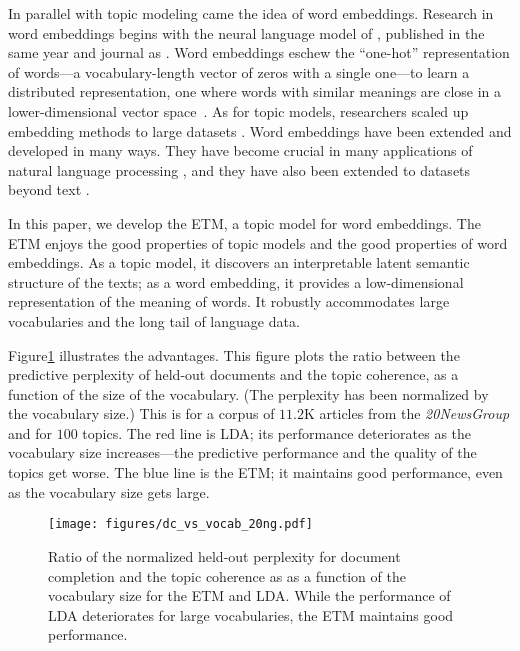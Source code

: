 \documentclass[11pt,a4paper]{article}
\begin{document}
In parallel with topic modeling came the idea of word embeddings.
Research in word embeddings begins with the neural language model of
\citet{Bengio:2003}, published in the same year and journal as
\citet{blei2003latent}. Word embeddings eschew the ``one-hot''
representation of words---a vocabulary-length vector of zeros with a
single one---to learn a distributed representation, one where words
with similar meanings are close in a lower-dimensional vector
space~\citep{Rumelhart:1973,bengio2006neural}.
As for topic models, researchers scaled
up embedding methods to large datasets
\citep{mikolov2013efficient,mikolov2013distributed,pennington2014glove,levy2014neural,mnih2013learning}.
Word embeddings have been extended and developed in many ways.  They
have become crucial in many applications of natural language
processing \citep{Li2017}, and they have also been extended to datasets
beyond text \citep{Rudolph2016}.

In this paper, we develop the \gls{ETM}, a topic model for word
embeddings. The \gls{ETM} enjoys the good properties of topic models
and the good properties of word embeddings.  As a topic model, it
discovers an interpretable latent semantic structure of the texts; as
a word embedding, it provides a low-dimensional representation of the
meaning of words.  It robustly accommodates large vocabularies and the
long tail of language data.

Figure\nobreakspace \ref {fig:log_lik_intro} illustrates the advantages.  This figure plots the
ratio between the predictive perplexity of held-out documents and the topic
coherence, as a function of the size of the vocabulary.
(The perplexity has been normalized by the vocabulary size.)
This is for a corpus of $11.2$K articles from the \textit{20NewsGroup} and for $100$ topics.  
The red line is \gls{LDA}; its performance deteriorates as the vocabulary size
increases---the predictive performance and the quality of the topics get worse. 
The blue line is the \gls{ETM};
it maintains good performance, even as the vocabulary size gets large.

\begin{figure}[t]
	\centering
	\texttt{[image: figures/dc\_vs\_vocab\_20ng.pdf]}
	\caption{Ratio of the normalized held-out perplexity for document completion
	and the topic coherence as as a function of the vocabulary size for the \acrshort{ETM} and \acrshort{LDA}. While the performance of \gls{LDA} deteriorates for large vocabularies, the \gls{ETM} maintains good performance.
	\label{fig:log_lik_intro}}
\end{figure}
\end{document}
